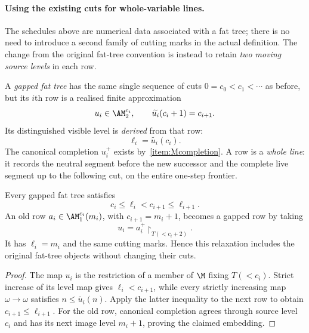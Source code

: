 \paragraph{Using the existing cuts for whole-variable lines.}
The schedules above are numerical data associated with a fat tree;
there is no need to introduce a second family of cutting marks in the
actual definition. The change from the original fat-tree convention
is instead to retain \emph{two moving source levels} in each row.

\begin{definition}\label{def:bl-gapped-rows}
A \emph{gapped fat tree} has the same single sequence of cuts
$0=c_0<c_1<\cdots$ as before, but its $i$th row is a realised
finite approximation
$$
 u_i\in\AM^{c_i}_2,\qquad\widetilde{u_i}(c_i+1)=c_{i+1}.
$$
Its distinguished visible level is \emph{derived} from that row:
$$
 \ell_i=\widetilde{u_i}(c_i).
$$
The canonical completion $u_i^+$ exists by~\ref{item:Mcompletion}.
A row is a \emph{whole line}: it records the neutral segment before
the new successor and the complete live segment up to the following
cut, on the entire one-step frontier.
\end{definition}
\begin{observation}
\label{obs:bl-old-rows-gapped}
Every gapped fat tree satisfies
$$
 c_i\leq\ell_i<c_{i+1}\leq\ell_{i+1}.
$$
An old row $a_i\in\AM^{c_i}_1(m_i)$, with
$c_{i+1}=m_i+1$, becomes a gapped row by taking
$$
 u_i=a_i^+\restriction_{T({<}c_i+2)}.
$$
It has $\ell_i=m_i$ and the same cutting marks. Hence this
relaxation includes the original fat-tree objects without changing
their cuts.
\end{observation}
\begin{proof}
The map $u_i$ is the restriction of a member of $\M$ fixing
$T({<}c_i)$. Strict increase of its level map gives
$\ell_i<c_{i+1}$, while every strictly increasing map
$\omega\to\omega$ satisfies $n\leq\widetilde{u_i}(n)$.
Apply the latter inequality to the next row to obtain
$c_{i+1}\leq\ell_{i+1}$. For the old row, canonical
completion agrees through source level $c_i$ and has its next
image level $m_i+1$, proving the claimed embedding.
\end{proof}

